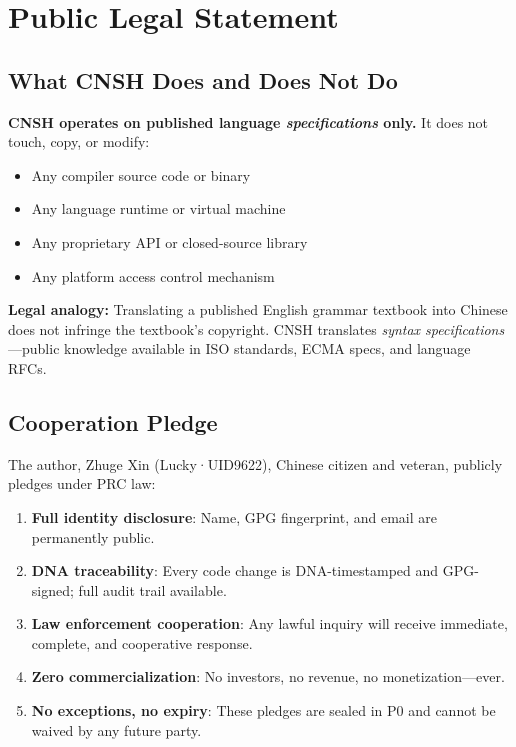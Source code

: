 \documentclass[conference]{IEEEtran}
\begin{document}
\section{Public Legal Statement}

\subsection{What CNSH Does and Does Not Do}

\begin{tcolorbox}[
  colback=jadeGreen!6,
  colframe=jadeGreen!60,
  title={\textbf{CNSH Legal Compliance Declaration}},
  fonttitle=\small\bfseries
]
\small
\textbf{CNSH operates on published language \emph{specifications}
only.}
It does not touch, copy, or modify:
\begin{itemize}\itemsep2pt
  \item Any compiler source code or binary
  \item Any language runtime or virtual machine
  \item Any proprietary API or closed-source library
  \item Any platform access control mechanism
\end{itemize}
\textbf{Legal analogy:} Translating a published English grammar
textbook into Chinese does not infringe the textbook's copyright.
CNSH translates \emph{syntax specifications}---public knowledge
available in ISO standards, ECMA specs, and language RFCs.
\end{tcolorbox}

\subsection{Cooperation Pledge}

The author, Zhuge Xin (Lucky·UID9622), Chinese citizen and
veteran, publicly pledges under PRC law:

\begin{enumerate}
  \item \textbf{Full identity disclosure}: Name, GPG fingerprint,
  and email are permanently public.
  \item \textbf{DNA traceability}: Every code change is
  DNA-timestamped and GPG-signed; full audit trail available.
  \item \textbf{Law enforcement cooperation}: Any lawful inquiry
  will receive immediate, complete, and cooperative response.
  \item \textbf{Zero commercialization}: No investors, no revenue,
  no monetization---ever.
  \item \textbf{No exceptions, no expiry}: These pledges are
  sealed in P0 and cannot be waived by any future party.
\end{enumerate}
\end{document}
